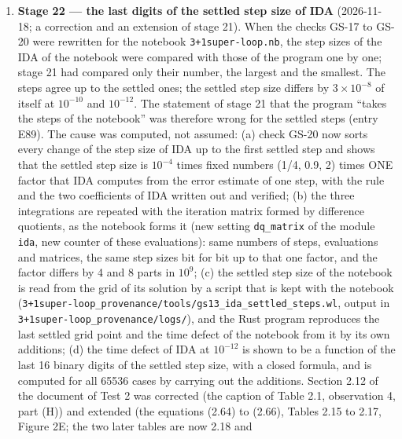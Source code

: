 \documentclass[
  10pt,
]{article}
\begin{document}
\begin{enumerate}
  of Test 2, its Appendix A.2h, and the corrected paragraph of its
  Section 2.11; ten registry entries of group 9 for the quantities of
  the analysis; the checks of the registry extended to every single item
  of an entry; \texttt{check\_all.sh} runs the new tests, the new check
  and the new figures (Section 11, entries E72 to E80).
\item
  \textbf{Stage 22 --- the last digits of the settled step size of IDA}
  (2026-11-18; a correction and an extension of stage 21). When the
  checks GS-17 to GS-20 were rewritten for the notebook
  \texttt{3+1super-loop.nb}, the step sizes of the IDA of the notebook
  were compared with those of the program one by one; stage 21 had
  compared only their number, the largest and the smallest. The steps
  agree up to the settled ones; the settled step size differs by
  \(3\times10^{-8}\) of itself at \(10^{-10}\) and \(10^{-12}\). The
  statement of stage 21 that the program ``takes the steps of the
  notebook'' was therefore wrong for the settled steps (entry E89). The
  cause was computed, not assumed: (a) check GS-20 now sorts every
  change of the step size of IDA up to the first settled step and shows
  that the settled step size is \(10^{-4}\) times fixed numbers (1/4,
  0.9, 2) times ONE factor that IDA computes from the error estimate of
  one step, with the rule and the two coefficients of IDA written out
  and verified; (b) the three integrations are repeated with the
  iteration matrix formed by difference quotients, as the notebook forms
  it (new setting \texttt{dq\_matrix} of the module \texttt{ida}, new
  counter of these evaluations): same numbers of steps, evaluations and
  matrices, the same step sizes bit for bit up to that one factor, and
  the factor differs by 4 and 8 parts in \(10^{9}\); (c) the settled
  step size of the notebook is read from the grid of its solution by a
  script that is kept with the notebook
  (\texttt{3+1super-loop\_provenance/tools/gs13\_ida\_settled\_steps.wl},
  output in \texttt{3+1super-loop\_provenance/logs/}), and the Rust
  program reproduces the last settled grid point and the time defect of
  the notebook from it by its own additions; (d) the time defect of IDA
  at \(10^{-12}\) is shown to be a function of the last 16 binary digits
  of the settled step size, with a closed formula, and is computed for
  all 65536 cases by carrying out the additions. Section 2.12 of the
  document of Test 2 was corrected (the caption of Table 2.1,
  observation 4, part (H)) and extended (the equations (2.64) to (2.66),
  Tables 2.15 to 2.17, Figure 2E; the two later tables are now 2.18 and

\end{enumerate}
\end{document}
